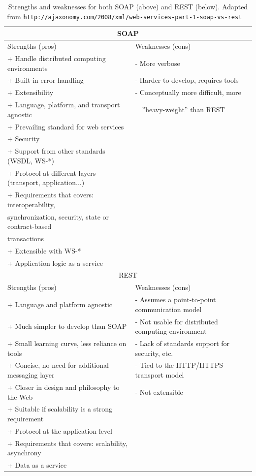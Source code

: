 \documentclass[final,1p,times]{elsarticle}
\begin{document}
\begin{table}[!ht]
\small{
\begin{tabular}{|l|l|}

\hline 
\multicolumn{2}{|c|}{SOAP} \\
\hline 
Strengths (pros) & Weaknesses (cons) \\
\hline
+ Handle distributed computing environments & - More verbose \\
+ Built-in error handling  &  - Harder to develop, requires tools \\
+ Extensibility & - Conceptually more difficult, more \\
+ Language, platform, and transport agnostic & \ \ ''heavy-weight'' than REST \\
+ Prevailing standard for web services & \\
+ Security & \\
+ Support from other standards (WSDL, WS-*) &   \\
+ Protocol at different layers (transport, application...)  &   \\
+ Requirements that covers: interoperability,  &   \\
synchronization, security, state or contract-based   &   \\
transactions   &   \\
+ Extensible with WS-*  &   \\
+ Application logic as a service  &   \\
\hline

\hline 
\multicolumn{2}{|c|}{REST} \\
\hline 
Strengths (pros) & Weaknesses (cons) \\
\hline
+ Language and platform agnostic & - Assumes a point-to-point communication model \\
+ Much simpler to develop than SOAP & - Not usable for distributed computing environment \\
+ Small learning curve, less reliance on tools & - Lack of standards support for security, etc. \\
+ Concise, no need for additional messaging layer & - Tied to the HTTP/HTTPS transport model \\
+ Closer in design and philosophy to the Web &  - Not extensible \\
+ Suitable if scalability is a strong requirement &  \\
+ Protocol at the application level  &   \\
+ Requirements that covers: scalability, asynchrony  &   \\
+ Data as a service &   \\
\hline

\end{tabular}
}
\caption{Strengths and weaknesses for both SOAP (above) and REST (below). Adapted from \tt{http://ajaxonomy.com/2008/xml/web-services-part-1-soap-vs-rest}  \label{tabla:pro_cons} }
\end{table}
\end{document}
